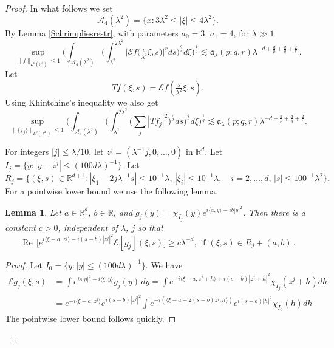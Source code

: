 \documentclass[11pt]{amsart}
\newtheorem{lemma}[theorem]{Lemma}
\theoremstyle{definition}
\numberwithin{theorem}{section}
\numberwithin{definition}{section}
\numberwithin{equation}{section}
\def\inn#1#2{\langle#1,#2\rangle}
\newcommand{\Be}{\begin{equation}}
\newcommand{\Ee}{\end{equation}}
\renewcommand{\le}{\leqslant}
\renewcommand{\ge}{\geqslant}
\def\Re{\operatorname{Re\,}}
\def\inn#1#2{\langle#1,#2\rangle}
\def\lc{\lesssim}
\def\la{\lambda}             \def\La{\Lambda}
\def\fa{{\mathfrak {a}}}
\def\bbR{{\mathbb {R}}}
\def\cA{{\mathcal {A}}}
\def\cE{{\mathcal {E}}}
\def\Re{\operatorname{Re\,} }
\renewcommand{\le}{\leqslant}
\renewcommand{\ge}{\geqslant}
\begin{document}
\begin{proof}
In what follows we set
$$\cA_4(\la^2)= \{x:3\la^2\le |\xi|\le 4\la^2\}.$$
By Lemma \ref{Schrimpliesrestr}, with parameters $a_0=3$, $a_1=4$,
for $\la\gg 1$
\begin{equation*}
\sup_{\|f\|_{L^p(\bbR^d)}\le 1}\Big(\int_{\cA_4(\la^2)}\Big(\int_{\la^2}^{2\la^2}
\big|\cE f \big(\tfrac{ s  }{\la^2} \xi,  s  \big)\big|^r
d s  \Big)^{\frac qr}d\xi\Big)^{\frac1q}\lesssim \fa_\la (p;q,r) \la^{- d+\frac
dp +\frac dq+\frac 2r}\,.
\end{equation*}
Let $$Tf(\xi, s  ) =
\cE f(\tfrac{ s  }{\la^2} \xi,  s  ).$$
Using
Khintchine's inequality we also get
\Be
\label{lqlrext3}
\sup_{\|\{ f_j\}\|_{L^p(\ell^2)} \le 1 }
\Big(\int_{\cA_4(\la^2)}\Big(\int_{\la^2}^{2\la ^2}
\big(\sum_j|Tf_j|^2\Big)^{\frac r2}
 d s  \Big)^{\frac qr}d\xi\Big)^{\frac1q}\lc \fa_\la (p;q,r) \la^{- d+\frac dp +\frac dq+\frac 2r}.
\Ee


For integers  $|j|\le \la/10$, let $z^j= (\la^{-1}j,0,\dots, 0)$ in
$\bbR^d$. Let $I_j=\{y: |y-z^j|\le (100 d\la)^{-1}\}.$ Let
$$R_j=\{(\xi, s  )\in \bbR^{d+1}: |\xi_1- 2j\la^{-1} s  |\le 10^{-1}\la,\, |\xi_i|\le
10^{-1}\la, \quad i=2,\dots, d,\,| s  |\le 100^{-1}\la^2\}.$$ For a
pointwise lower bound we use the following  lemma.


\begin{lemma}\label{lower} Let $a\in \bbR^d$, $b\in \bbR$,
and $g_j(y)= \chi_{I_j}(y) e^{i\inn a y-ib|y|^2}$. Then there is a
constant $c>0$, independent of $\la$, $j$ so that
\begin{equation*}
\Re\big[e^{i\inn{\xi-a}{z^j}-i( s  -b)|z^j|^2}
\cE[g_j](\xi, s  )\big]
 \ge c\la^{-d}, \text{ if } (\xi, s  )\in R_j+(a,b)\,.
\end{equation*}
\end{lemma}


\begin{proof} Let $I_0=\{y: |y|\le (100 d\la)^{-1}\}.$
We have
\begin{align*}
\cE g_j(\xi, s  )&= \int e^{i  s  |y|^2-i \inn{\xi}{y}} g_j(y) \, dy
=
\int e^{-i\inn {\xi-a}{z^j+h}+i( s  -b)|z^j+h|^2} \chi_{I_j}(z^j+h) dh
\\
&=e^{-i\inn{\xi-a}{z^j}}e^{i( s  -b)|z^j|^2}
\int e^{-i(\inn {\xi-a-2( s  -b)z^j}{h})} e^{i( s  -b)|h|^2}\chi_{I_0}(h) dh
\end{align*}
The pointwise lower bound follows quickly.
\end{proof}


\end{proof}
\end{document}
